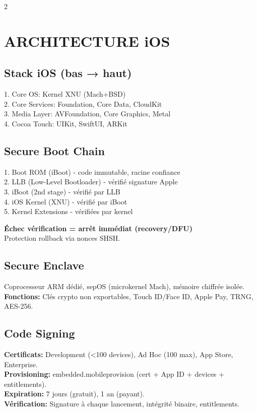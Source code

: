 \documentclass[9pt,a4paper]{extarticle}
\begin{document}
\begin{multicols}{2}
\section*{ARCHITECTURE iOS}

\subsection*{Stack iOS (bas → haut)}
1. Core OS: Kernel XNU (Mach+BSD)\\
2. Core Services: Foundation, Core Data, CloudKit\\
3. Media Layer: AVFoundation, Core Graphics, Metal\\
4. Cocoa Touch: UIKit, SwiftUI, ARKit

\subsection*{Secure Boot Chain}
1. Boot ROM (iBoot) - code immutable, racine confiance\\
2. LLB (Low-Level Bootloader) - vérifié signature Apple\\
3. iBoot (2nd stage) - vérifié par LLB\\
4. iOS Kernel (XNU) - vérifié par iBoot\\
5. Kernel Extensions - vérifiées par kernel

\textbf{Échec vérification = arrêt immédiat (recovery/DFU)}\\
Protection rollback via nonces SHSH.

\subsection*{Secure Enclave}
Coprocesseur ARM dédié, sepOS (microkernel Mach), mémoire chiffrée isolée.\\
\textbf{Fonctions:} Clés crypto non exportables, Touch ID/Face ID, Apple Pay, TRNG, AES-256.

\subsection*{Code Signing}
\textbf{Certificats:} Development (<100 devices), Ad Hoc (100 max), App Store, Enterprise.\\
\textbf{Provisioning:} embedded.mobileprovision (cert + App ID + devices + entitlements).\\
\textbf{Expiration:} 7 jours (gratuit), 1 an (payant).\\
\textbf{Vérification:} Signature à chaque lancement, intégrité binaire, entitlements.


\end{multicols}
\end{document}
